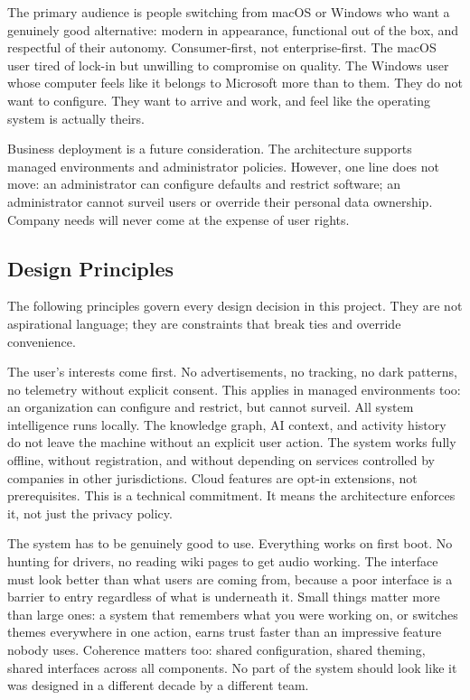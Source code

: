 The primary audience is people switching from macOS or Windows who want a
genuinely good alternative: modern in appearance, functional out of the box,
and respectful of their autonomy. Consumer-first, not enterprise-first. The
macOS user tired of lock-in but unwilling to compromise on quality. The Windows
user whose computer feels like it belongs to Microsoft more than to them. They
do not want to configure. They want to arrive and work, and feel like the
operating system is actually theirs.

Business deployment is a future consideration. The architecture supports managed
environments and administrator policies. However, one line does not move:
an administrator can configure defaults and restrict software; an administrator
cannot surveil users or override their personal data ownership. Company needs
will never come at the expense of user rights.

\subsection{Design Principles}
\label{sec:principles}

The following principles govern every design decision in this project. They are
not aspirational language; they are constraints that break ties and override
convenience.

The user's interests come first. No advertisements, no tracking, no dark patterns,
no telemetry without explicit consent. This applies in managed environments too:
an organization can configure and restrict, but cannot surveil. All system
intelligence runs locally. The knowledge graph, AI context, and activity history
do not leave the machine without an explicit user action. The system works fully
offline, without registration, and without depending on services controlled by
companies in other jurisdictions. Cloud features are opt-in extensions, not
prerequisites. This is a technical commitment. It means the architecture enforces
it, not just the privacy policy.

The system has to be genuinely good to use. Everything works on first boot. No
hunting for drivers, no reading wiki pages to get audio working. The interface
must look better than what users are coming from, because a poor interface is a
barrier to entry regardless of what is underneath it. Small things matter more
than large ones: a system that remembers what you were working on, or switches
themes everywhere in one action, earns trust faster than an impressive feature
nobody uses. Coherence matters too: shared configuration, shared theming, shared
interfaces across all components. No part of the system should look like it was
designed in a different decade by a different team.

